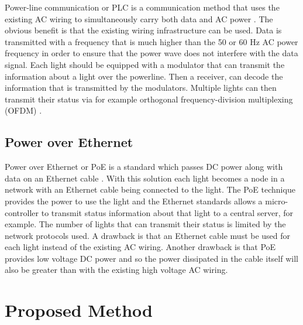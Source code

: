 		Power-line communication or PLC is a communication method that uses the existing AC wiring to simultaneously carry both data and AC power \cite{1205458}.
		The obvious benefit is that the existing wiring infrastructure can be used.
		Data is transmitted with a frequency that is much higher than the 50 or 60 Hz AC power frequency in order to ensure that the power wave does not interfere with the data signal.
		Each light should be equipped with a modulator that can transmit the information about a light over the powerline.
		Then a receiver, can decode the information that is transmitted by the modulators.
		Multiple lights can then transmit their status via for example orthogonal frequency-division multiplexing (OFDM) \cite{hoch2011comparison}.




		\subsection{Power over Ethernet}

		Power over Ethernet or PoE is a standard which passes DC power along with data on an Ethernet cable \cite{patoka2003power}.
		With this solution each light becomes a node in a network with an Ethernet cable being connected to the light.
		The PoE technique provides the power to use the light and the Ethernet standards allows a micro-controller to transmit status information about that light to a central server, for example.
		The number of lights that can transmit their status is limited by the network protocols used.
		A drawback is that an Ethernet cable must be used for each light instead of the existing AC wiring.
		Another drawback is that PoE provides low voltage DC power and so the power dissipated in the cable itself will also be greater than with the existing high voltage AC wiring.




	\section{Proposed Method}


